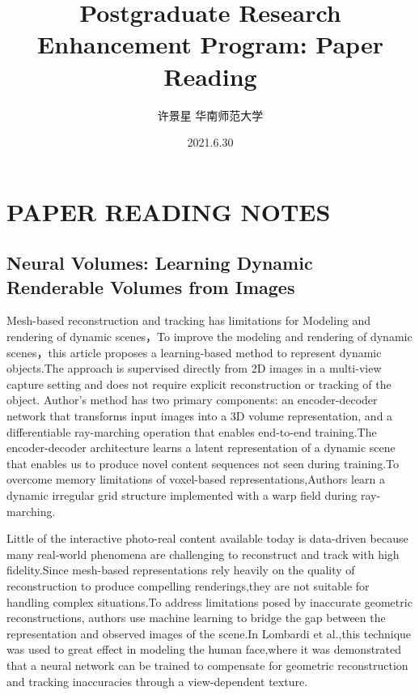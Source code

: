 \documentclass[UTF-8]{ctexart}
\title{Postgraduate Research Enhancement Program: Paper Reading}
\author{许景星 \quad 华南师范大学}
\date{2021.6.30}
\begin{document}
\maketitle
\thispagestyle{empty}
\clearpage

\pagestyle{plain}
\setcounter{page}{1}

\section{PAPER READING NOTES}

\subsection{Neural Volumes: Learning Dynamic Renderable Volumes from Images}
Mesh-based reconstruction and tracking has limitations for Modeling and rendering of dynamic scenes，To improve the modeling and rendering of dynamic scenes，this article proposes a learning-based method to represent dynamic objects.The approach is supervised directly from 2D images in a multi-view capture setting and does not require explicit reconstruction or tracking of the object. Author's method has two primary components: an encoder-decoder network that transforms input images into a 3D volume representation, and a differentiable ray-marching operation that enables end-to-end training.The encoder-decoder architecture learns a latent representation of a dynamic scene that enables us to produce novel content sequences not seen during training.To overcome memory limitations of voxel-based representations,Authors learn a dynamic irregular grid structure implemented with a warp field during ray-marching.\par

Little of the interactive photo-real content available today is data-driven because many real-world phenomena are challenging to reconstruct and track with high fidelity.Since mesh-based representations rely heavily on the quality of reconstruction to produce compelling renderings,they are not suitable for handling complex situations.To address limitations posed by inaccurate geometric reconstructions, authors use machine learning to bridge the gap between the representation and observed images of the scene.In Lombardi et al.,this technique was used to great effect in modeling the human face,where it was demonstrated that a neural network can be trained to compensate for geometric reconstruction and tracking inaccuracies through a view-dependent texture.
\end{document}
